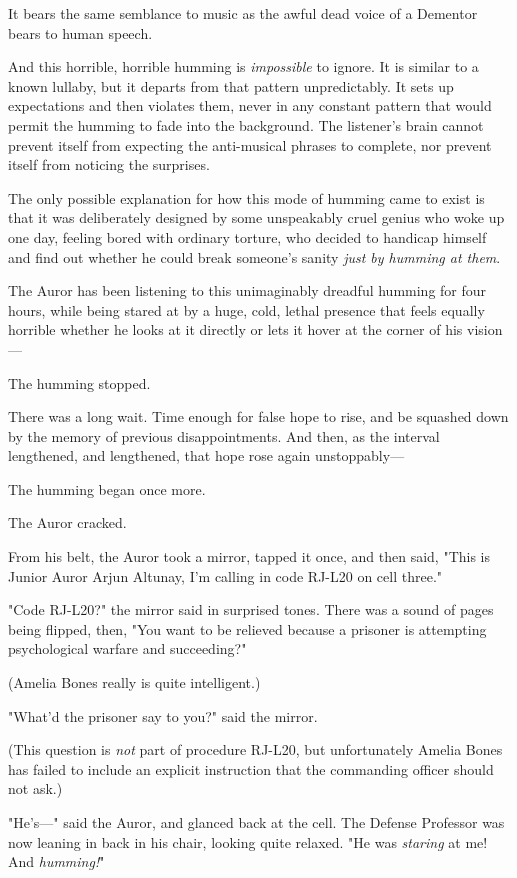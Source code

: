 It bears the same semblance to music as the awful dead voice of a Dementor 
bears to human speech.

And this horrible, horrible humming is \emph{impossible} to ignore. It is 
similar to a known lullaby, but it departs from that pattern unpredictably. It 
sets up expectations and then violates them, never in any constant pattern that 
would permit the humming to fade into the background. The listener's brain 
cannot prevent itself from expecting the anti-musical phrases to complete, nor 
prevent itself from noticing the surprises.

The only possible explanation for how this mode of humming came to exist is 
that it was deliberately designed by some unspeakably cruel genius who woke up 
one day, feeling bored with ordinary torture, who decided to handicap himself 
and find out whether he could break someone's sanity \emph{just by humming at 
them}.

The Auror has been listening to this unimaginably dreadful humming for four 
hours, while being stared at by a huge, cold, lethal presence that feels 
equally horrible whether he looks at it directly or lets it hover at the corner 
of his vision---

The humming stopped.

There was a long wait. Time enough for false hope to rise, and be squashed down 
by the memory of previous disappointments. And then, as the interval 
lengthened, and lengthened, that hope rose again unstoppably---

The humming began once more.

The Auror cracked.

From his belt, the Auror took a mirror, tapped it once, and then said, "This is 
Junior Auror Arjun Altunay, I'm calling in code RJ-L20 on cell three."

"Code RJ-L20?" the mirror said in surprised tones. There was a sound of pages 
being flipped, then, "You want to be relieved because a prisoner is attempting 
psychological warfare and succeeding?"

(Amelia Bones really is quite intelligent.)

"What'd the prisoner say to you?" said the mirror.

(This question is \emph{not} part of procedure RJ-L20, but unfortunately Amelia 
Bones has failed to include an explicit instruction that the commanding officer 
should not ask.)

"He's---" said the Auror, and glanced back at the cell. The Defense Professor 
was now leaning in back in his chair, looking quite relaxed. "He was 
\emph{staring} at me! And \emph{humming!}"

